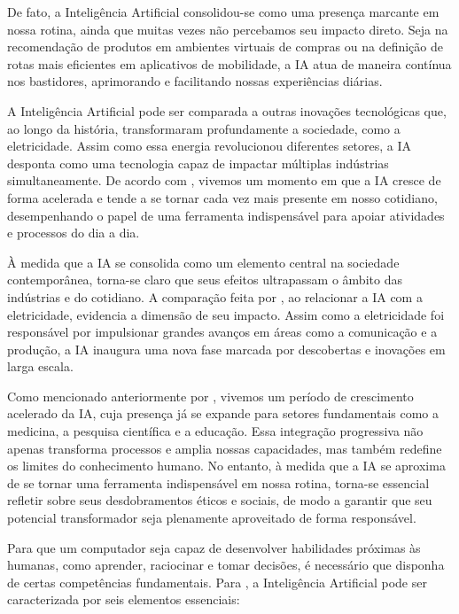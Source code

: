 \documentclass[english,brazilian]{UNISINOSartigo} %
\begin{document}
De fato, a Inteligência Artificial consolidou-se como uma presença marcante em nossa rotina, ainda que muitas vezes não percebamos seu impacto direto. Seja na recomendação de produtos em ambientes virtuais de compras ou na definição de rotas mais eficientes em aplicativos de mobilidade, a IA atua de maneira contínua nos bastidores, aprimorando e facilitando nossas experiências diárias.

A Inteligência Artificial pode ser comparada a outras inovações tecnológicas que, ao longo da história, transformaram profundamente a sociedade, como a eletricidade. Assim como essa energia revolucionou diferentes setores, a IA desponta como uma tecnologia capaz de impactar múltiplas indústrias simultaneamente. De acordo com , vivemos um momento em que a IA cresce de forma acelerada e tende a se tornar cada vez mais presente em nosso cotidiano, desempenhando o papel de uma ferramenta indispensável para apoiar atividades e processos do dia a dia.

À medida que a IA se consolida como um elemento central na sociedade contemporânea, torna-se claro que seus efeitos ultrapassam o âmbito das indústrias e do cotidiano. A comparação feita por , ao relacionar a IA com a eletricidade, evidencia a dimensão de seu impacto. Assim como a eletricidade foi responsável por impulsionar grandes avanços em áreas como a comunicação e a produção, a IA inaugura uma nova fase marcada por descobertas e inovações em larga escala.

Como mencionado anteriormente por , vivemos um período de crescimento acelerado da IA, cuja presença já se expande para setores fundamentais como a medicina, a pesquisa científica e a educação. Essa integração progressiva não apenas transforma processos e amplia nossas capacidades, mas também redefine os limites do conhecimento humano. No entanto, à medida que a IA se aproxima de se tornar uma ferramenta indispensável em nossa rotina, torna-se essencial refletir sobre seus desdobramentos éticos e sociais, de modo a garantir que seu potencial transformador seja plenamente aproveitado de forma responsável.

Para que um computador seja capaz de desenvolver habilidades próximas às humanas, como aprender, raciocinar e tomar decisões, é necessário que disponha de certas competências fundamentais. Para , a Inteligência Artificial pode ser caracterizada por seis elementos essenciais:
\end{document}
